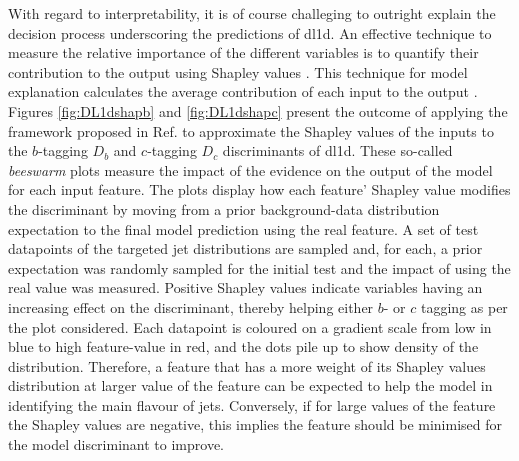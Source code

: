 With regard to interpretability, it is of course challeging to outright explain the decision process underscoring the predictions of \gls{dl1d}. An effective technique to measure the relative importance of the different variables is to quantify their contribution to the output using Shapley values \cite{Rozemberczki2022TheSV}. This technique for model explanation calculates the average contribution of each input to the output \cite{Rozemberczki2022TheSV}. Figures \ref{fig:DL1dshapb} and \ref{fig:DL1dshapc} present the outcome of applying the framework proposed in Ref. \cite{NIPS2017_7062} to approximate the Shapley values of the inputs to the $b$-tagging $D_b$ and $c$-tagging $D_c$ discriminants of \gls{dl1d}. These so-called \textit{beeswarm} plots measure the impact of the evidence on the output of the model for each input feature. The plots display how each feature' Shapley value modifies the discriminant by moving from a prior background-data distribution expectation to the final model prediction using the real feature. A set of test datapoints of the targeted jet distributions are sampled and, for each, a prior expectation was randomly sampled for the initial test and the impact of using the real value was measured. Positive Shapley values indicate variables having an increasing effect on the discriminant, thereby helping either $b$- or $c$ tagging as per the plot considered. Each datapoint is coloured on a gradient scale from low in blue to high feature-value in red, and the dots pile up to show density of the distribution. Therefore, a feature that has a more weight of its Shapley values distribution at larger value of the feature can be expected to help the model in identifying the main flavour of jets. Conversely, if for large values of the feature the Shapley values are negative, this implies the feature should be minimised for the model discriminant to improve. 

